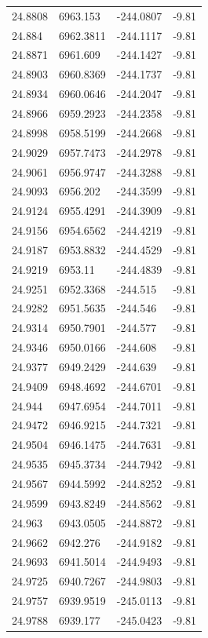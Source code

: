 \begin{table}[H]
\begin{tabular}{llll}
24.8808 & 6963.153 & -244.0807 & -9.81 \\
24.884 & 6962.3811 & -244.1117 & -9.81 \\
24.8871 & 6961.609 & -244.1427 & -9.81 \\
24.8903 & 6960.8369 & -244.1737 & -9.81 \\
24.8934 & 6960.0646 & -244.2047 & -9.81 \\
24.8966 & 6959.2923 & -244.2358 & -9.81 \\
24.8998 & 6958.5199 & -244.2668 & -9.81 \\
24.9029 & 6957.7473 & -244.2978 & -9.81 \\
24.9061 & 6956.9747 & -244.3288 & -9.81 \\
24.9093 & 6956.202 & -244.3599 & -9.81 \\
24.9124 & 6955.4291 & -244.3909 & -9.81 \\
24.9156 & 6954.6562 & -244.4219 & -9.81 \\
24.9187 & 6953.8832 & -244.4529 & -9.81 \\
24.9219 & 6953.11 & -244.4839 & -9.81 \\
24.9251 & 6952.3368 & -244.515 & -9.81 \\
24.9282 & 6951.5635 & -244.546 & -9.81 \\
24.9314 & 6950.7901 & -244.577 & -9.81 \\
24.9346 & 6950.0166 & -244.608 & -9.81 \\
24.9377 & 6949.2429 & -244.639 & -9.81 \\
24.9409 & 6948.4692 & -244.6701 & -9.81 \\
24.944 & 6947.6954 & -244.7011 & -9.81 \\
24.9472 & 6946.9215 & -244.7321 & -9.81 \\
24.9504 & 6946.1475 & -244.7631 & -9.81 \\
24.9535 & 6945.3734 & -244.7942 & -9.81 \\
24.9567 & 6944.5992 & -244.8252 & -9.81 \\
24.9599 & 6943.8249 & -244.8562 & -9.81 \\
24.963 & 6943.0505 & -244.8872 & -9.81 \\
24.9662 & 6942.276 & -244.9182 & -9.81 \\
24.9693 & 6941.5014 & -244.9493 & -9.81 \\
24.9725 & 6940.7267 & -244.9803 & -9.81 \\
24.9757 & 6939.9519 & -245.0113 & -9.81 \\
24.9788 & 6939.177 & -245.0423 & -9.81 \\

\end{tabular}
\end{table}
